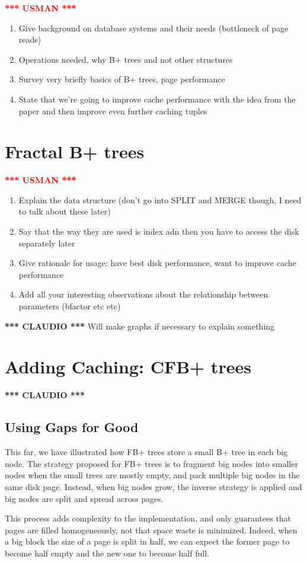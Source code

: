 \documentclass{article}
\newcommand{\usman}{\textcolor{Red}{\textbf{*** USMAN ***} }}
\newcommand{\claudio}{\textcolor{Cerulean}{\textbf{*** CLAUDIO ***} }}
\begin{document}
\usman
\begin{enumerate}
	\item Give background on database systems and their needs (bottleneck of page reads)
	\item Operations needed, why B+ trees and not other structures
	\item Survey very briefly basics of B+ trees, page performance
	\item State that we're going to improve cache performance with the idea from the paper and then improve even further
caching tuples
\end{enumerate}



\section{Fractal B+ trees}
\usman
\begin{enumerate}
	\item Explain the data structure (don't go into SPLIT and MERGE though, I need to talk about these later)
	\item Say that the way they are used is index adn then you have to access the disk separately later 
	\item Give rationale for usage: have best disk performance, want to improve cache performance
	\item Add all your interesting observations about the relationship between parameters (bfactor etc etc)
\end{enumerate}
\claudio
Will make graphs if necessary to explain something

\section{Adding Caching: CFB+ trees}
\claudio
\subsection{Using Gaps for Good}
This far, we have illustrated how FB+ trees store a small B+ tree in each big node.
The strategy proposed for FB+ trees is to fragment big nodes into smaller nodes when the small trees
are mostly empty, and pack multiple big nodes in the same disk page.
Instead, when big nodes grow, the inverse strategy is applied and big nodes are split and spread
across pages.

This process adds complexity to the implementation, and only guarantees that pages are filled
homogeneously, not that space waste is minimized.
Indeed, when a big block the size of a page is split in half,
we can expect the former page to become half empty and the new one to become half full.
\end{document}
